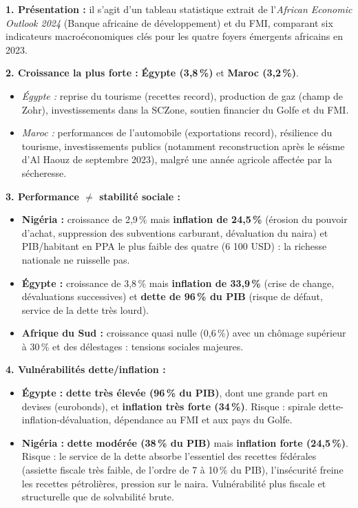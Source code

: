 \documentclass[11pt]{article}
\begin{document}
\begin{corrige}[Exercice n°14-4]
\textbf{1. Présentation :} il s'agit d'un tableau statistique extrait de l'\emph{African Economic Outlook 2024} (Banque africaine de développement) et du FMI, comparant six indicateurs macroéconomiques clés pour les quatre foyers émergents africains en 2023.

\textbf{2. Croissance la plus forte :} \textbf{Égypte (3,8\,\%)} et \textbf{Maroc (3,2\,\%)}.
\begin{itemize}
    \item \emph{Égypte :} reprise du tourisme (recettes record), production de gaz (champ de Zohr), investissements dans la SCZone, soutien financier du Golfe et du FMI.
    \item \emph{Maroc :} performances de l'automobile (exportations record), résilience du tourisme, investissements publics (notamment reconstruction après le séisme d'Al Haouz de septembre 2023), malgré une année agricole affectée par la sécheresse.
\end{itemize}

\textbf{3. Performance $\neq$ stabilité sociale :}
\begin{itemize}
    \item \textbf{Nigéria :} croissance de 2,9\,\% mais \textbf{inflation de 24,5\,\%} (érosion du pouvoir d'achat, suppression des subventions carburant, dévaluation du naira) et PIB/habitant en PPA le plus faible des quatre (6 100 USD) : la richesse nationale ne ruisselle pas.
    \item \textbf{Égypte :} croissance de 3,8\,\% mais \textbf{inflation de 33,9\,\%} (crise de change, dévaluations successives) et \textbf{dette de 96\,\% du PIB} (risque de défaut, service de la dette très lourd).
    \item \textbf{Afrique du Sud :} croissance quasi nulle (0,6\,\%) avec un chômage supérieur à 30\,\% et des délestages : tensions sociales majeures.
\end{itemize}

\textbf{4. Vulnérabilités dette/inflation :}
\begin{itemize}
    \item \textbf{Égypte :} \textbf{dette très élevée (96\,\% du PIB)}, dont une grande part en devises (eurobonds), et \textbf{inflation très forte (34\,\%)}. Risque : spirale dette-inflation-dévaluation, dépendance au FMI et aux pays du Golfe.
    \item \textbf{Nigéria :} \textbf{dette modérée (38\,\% du PIB)} mais \textbf{inflation forte (24,5\,\%)}. Risque : le service de la dette absorbe l'essentiel des recettes fédérales (assiette fiscale très faible, de l'ordre de 7 à 10\,\% du PIB), l'insécurité freine les recettes pétrolières, pression sur le naira. Vulnérabilité plus fiscale et structurelle que de solvabilité brute.
\end{itemize}
\end{corrige}
\end{document}
